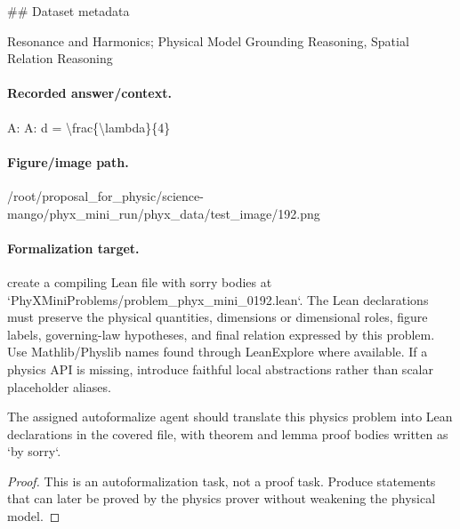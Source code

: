 \#\# Dataset metadata

Resonance and Harmonics; Physical Model Grounding Reasoning, Spatial Relation Reasoning

\paragraph{Recorded answer/context.}
A: A: d = \textbackslash{}frac\{\textbackslash{}lambda\}\{4\}

\paragraph{Figure/image path.}
/root/proposal\_for\_physic/science-mango/phyx\_mini\_run/phyx\_data/test\_image/192.png

\paragraph{Formalization target.}
create a compiling Lean file with sorry bodies at `PhyXMiniProblems/problem\_phyx\_mini\_0192.lean`. The Lean declarations must preserve the physical quantities, dimensions or dimensional roles, figure labels, governing-law hypotheses, and final relation expressed by this problem.
Use Mathlib/Physlib names found through LeanExplore where available. If a physics API is missing, introduce faithful local abstractions rather than scalar placeholder aliases.

\begin{theorem}
\label{thm:physics:phyx_mini_0192:target}
The assigned autoformalize agent should translate this physics problem into Lean declarations in the covered file, with theorem and lemma proof bodies written as `by sorry`.
\end{theorem}
\begin{proof}
This is an autoformalization task, not a proof task. Produce statements that can later be proved by the physics prover without weakening the physical model.
\end{proof}

